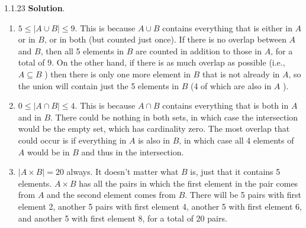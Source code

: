 \documentclass[11pt,]{book}
\theoremstyle{ptxplainnotitle}
\theoremstyle{ptxplaintitle}
\theoremstyle{ptxdefinitionnotitle}
\theoremstyle{ptxdefinitiontitle}
\theoremstyle{ptxdefinitionnotitle}
\theoremstyle{ptxdefinitiontitle}
\theoremstyle{ptxdefinitionnotitle}
\theoremstyle{ptxdefinitiontitle}
\theoremstyle{ptxdefinitiontitlenonumber}
\theoremstyle{ptxdefinitiontitlenonumber}
\numberwithin{equation}{chapter}
\begin{document}
\begin{divisionexercise}{1.1.23}
\textbf{Solution}.\quad%
\hypertarget{p-1001}{}%
\leavevmode%
\begin{enumerate}[label=\alph*.]
\item\hypertarget{li-442}{}\hypertarget{p-1002}{}%
\(5 \le |A\cup B| \le 9\text{.}\)  This is because \(A \cup B\) contains everything that is either in \(A\) or in \(B\text{,}\) or in both (but counted just once).  If there is no overlap between \(A\) and \(B\text{,}\) then all 5 elements in \(B\) are counted in addition to those in \(A\text{,}\) for a total of 9. On the other hand, if there is as much overlap as possible (i.e., \(A \subseteq B\) ) then there is only one more element in \(B\) that is not already in \(A\text{,}\) so the union will contain just the 5 elements in \(B\) (4 of which are also in \(A\) ).%
\item\hypertarget{li-443}{}\hypertarget{p-1003}{}%
\(0 \le |A \cap B| \le 4\text{.}\)  This is because \(A \cap B\) contains everything that is both in \(A\) and in \(B\text{.}\)  There could be nothing in both sets, in which case the intersection would be the empty set, which has cardinality zero.  The most overlap that could occur is if everything in \(A\) is also in \(B\text{,}\) in which case all 4 elements of \(A\) would be in \(B\) and thus in the intersection.%
\item\hypertarget{li-444}{}\hypertarget{p-1004}{}%
\(|A \times B| = 20\) always.  It doesn't matter what \(B\) is, just that it contains 5 elements. \(A \times B\) has all the pairs in which the first element in the pair comes from \(A\) and the second element comes from \(B\text{.}\)  There will be 5 pairs with first element 2, another 5 pairs with first element 4, another 5 with first element 6, and another 5 with first element 8, for a total of 20 pairs.%
\end{enumerate}
%
\end{divisionexercise}%
\end{document}
